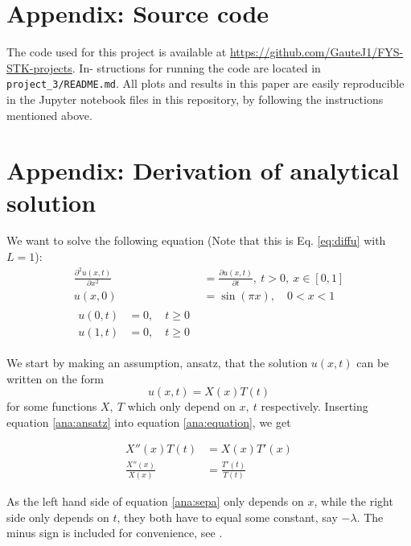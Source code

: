  \section{Appendix: Source code}

The code used for this project is available at
\url{https://github.com/GauteJ1/FYS-STK-projects}. In-
structions for running the code are located in
\texttt{project\_3/README.md}. All plots and results in this paper
are easily reproducible in the Jupyter notebook files in
this repository, by following the instructions mentioned
above.

\section{Appendix: Derivation of analytical solution}\label{appendixB}

We want to solve the following equation (Note that this is Eq. \ref{eq:diffu} with $L=1$):
\begin{align}\label{ana:equation}
\frac{\partial^2 u(x,t)}{\partial x^2}  &=\frac{\partial u(x,t)}{\partial t}, \ t>0, \ x\in [0, 1] \\
\label{ana:init}
u(x, 0) &= \sin(\pi x), \quad 0 < x < 1 \\
\begin{split}
\label{ana:bound}
    u(0,t) &= 0, \quad t\geq 0 \\
    u(1,t) &= 0, \quad t\geq 0
\end{split}
\end{align}

We start by making an assumption, ansatz, that the solution $u(x,t)$ can be written on the form
\begin{equation}\label{ana:ansatz}
u(x,t) = X(x)T(t)
\end{equation}
for some functions $X,\ T$ which only depend on $x,\ t$ respectively.
Inserting equation \ref{ana:ansatz} into equation \ref{ana:equation}, we get

\begin{align}
    X''(x)T(t) &= X(x) T'(x) \nonumber \\
    \frac{X''(x)}{X(x)} &= \frac{T'(t)}{T(t)} \label{ana:sepa}
\end{align}

As the left hand side of equation \ref{ana:sepa} only depends on $x$, while the right side only depends on $t$, they both have to equal some constant, say $-\lambda$. The minus sign is included for convenience, see \textcite[p. 90]{tveitoPDE}.

